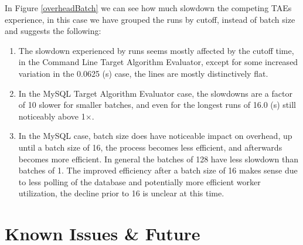 \documentclass[11pt,letterpaper,oneside]{article}
\begin{document}
In Figure \ref{overheadBatch} we can see how much slowdown the competing TAEs experience, in this case we have grouped the runs by cutoff, instead of batch size and suggests the following:

\begin{enumerate}

\item The slowdown experienced by runs seems mostly affected by the cutoff time, in the Command Line Target Algorithm Evaluator, except for some increased variation in the 0.0625 (s) case, the lines are mostly distinctively flat. 

\item In the MySQL Target Algorithm Evaluator case, the slowdowns are a factor of 10 slower for smaller batches, and even for the longest runs of 16.0 (s) still noticeably above 1$\times$.

\item In the MySQL case, batch size does have noticeable impact on overhead, up until a batch size of 16, the process becomes less efficient, and afterwards becomes more efficient. In general the batches of 128 have less slowdown than batches of 1. The improved efficiency after a batch size of 16 makes sense due to less polling of the database and potentially more efficient worker utilization, the decline prior to 16 is unclear at this time. 

\end{enumerate}




\section{Known Issues \& Future}
\end{document}

